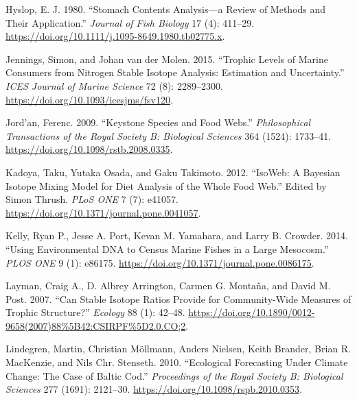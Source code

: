 \documentclass{article}
\newlength{\cslhangindent}
\newlength{\cslentryspacingunit} %
\newenvironment{CSLReferences}[2] %
 {%
  \setlength{\parindent}{0pt}
  \ifodd #1
  \let\oldpar\par
  \def\par{\hangindent=\cslhangindent\oldpar}
  \fi
  \setlength{\parskip}{#2\cslentryspacingunit}
 }%
 {}
\begin{document}
\begin{CSLReferences}{1}{0}
\leavevmode{}%
Hyslop, E. J. 1980. {``Stomach Contents Analysis---a Review of Methods
and Their Application.''} \emph{Journal of Fish Biology} 17 (4):
411--29. \url{https://doi.org/10.1111/j.1095-8649.1980.tb02775.x}.

\leavevmode{}%
Jennings, Simon, and Johan van der Molen. 2015. {``Trophic Levels of
Marine Consumers from Nitrogen Stable Isotope Analysis: Estimation and
Uncertainty.''} \emph{ICES Journal of Marine Science} 72 (8):
2289--2300. \url{https://doi.org/10.1093/icesjms/fsv120}.

\leavevmode{}%
Jord'an, Ferenc. 2009. {``Keystone Species and Food Webs.''}
\emph{Philosophical Transactions of the Royal Society B: Biological
Sciences} 364 (1524): 1733--41.
\url{https://doi.org/10.1098/rstb.2008.0335}.

\leavevmode{}%
Kadoya, Taku, Yutaka Osada, and Gaku Takimoto. 2012. {``{IsoWeb}: {A
Bayesian Isotope Mixing Model} for {Diet Analysis} of the {Whole Food
Web}.''} Edited by Simon Thrush. \emph{PLoS ONE} 7 (7): e41057.
\url{https://doi.org/10.1371/journal.pone.0041057}.

\leavevmode{}%
Kelly, Ryan P., Jesse A. Port, Kevan M. Yamahara, and Larry B. Crowder.
2014. {``Using {Environmental DNA} to {Census Marine Fishes} in a {Large
Mesocosm}.''} \emph{PLOS ONE} 9 (1): e86175.
\url{https://doi.org/10.1371/journal.pone.0086175}.

\leavevmode{}%
Layman, Craig A., D. Albrey Arrington, Carmen G. Montaña, and David M.
Post. 2007. {``Can {Stable Isotope Ratios Provide} for {Community}-{Wide
Measures} of {Trophic Structure}?''} \emph{Ecology} 88 (1): 42--48.
\url{https://doi.org/10.1890/0012-9658(2007)88\%5B42:CSIRPF\%5D2.0.CO;2}.

\leavevmode{}%
Lindegren, Martin, Christian Möllmann, Anders Nielsen, Keith Brander,
Brian R. MacKenzie, and Nils Chr. Stenseth. 2010. {``Ecological
Forecasting Under Climate Change: The Case of {Baltic} Cod.''}
\emph{Proceedings of the Royal Society B: Biological Sciences} 277
(1691): 2121--30. \url{https://doi.org/10.1098/rspb.2010.0353}.


\end{CSLReferences}
\end{document}
